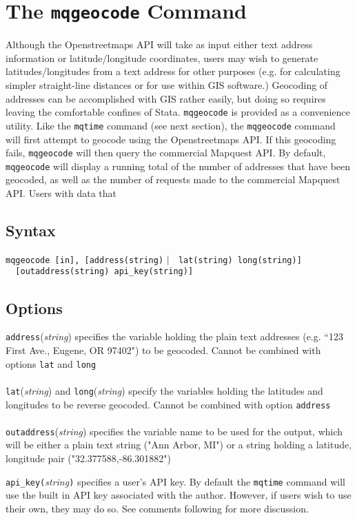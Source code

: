 \documentclass[11pt]{article}
\begin{document}
\section{The \texttt{mqgeocode} Command}
Although the Openstreetmaps API will take as input either text address information or latitude/longitude coordinates, users may wish to generate latitudes/longitudes from a text address for other purposes (e.g. for calculating simpler straight-line distances or for use within GIS software.) Geocoding of addresses can be accomplished with GIS rather easily, but doing so requires leaving the comfortable confines of Stata. \verb|mqgeocode| is provided as a convenience utility. Like the \verb|mqtime| command (see next section), the \verb|mqgeocode| command will first attempt to geocode using the Openstreetmaps API. If this geocoding fails, \verb|mqgeocode| will then query the commercial Mapquest API. By default,  \verb|mqgeocode| will display a running total of the number of addresses that have been geocoded, as well as the number of requests made to the commercial Mapquest API. Users with data that 

\subsection{Syntax}
\verb|mqgeocode [in], [address(string)| $\arrowvert$ \verb| lat(string) long(string)]|\\ \verb|  [outaddress(string) api_key(string)]|


\subsection{Options}
\verb|address|(\textit{string}) specifies the variable holding the plain text addresses (e.g. ``123 First Ave., Eugene, OR 97402") to be geocoded. Cannot be combined with options \verb|lat| and \verb|long|
\\ \\
\verb|lat|(\textit{string}) and \verb|long|(\textit{string}) specify the variables holding the latitudes and longitudes to be reverse geocoded. Cannot be combined with option \verb|address|
\\ \\
\verb|outaddress|(\textit{string}) specifies the variable name to be used for the output, which will be either a plain text string ("Ann Arbor, MI") or a string holding a latitude, longitude pair ("32.377588,-86.301882")

\verb|api_key(|\textit{string}\verb|)| specifies a user's API key. By default the \verb|mqtime| command will use the built in API key associated with the author. However, if users wish to use their own, they may do so. See comments following for more discussion.
\end{document}

